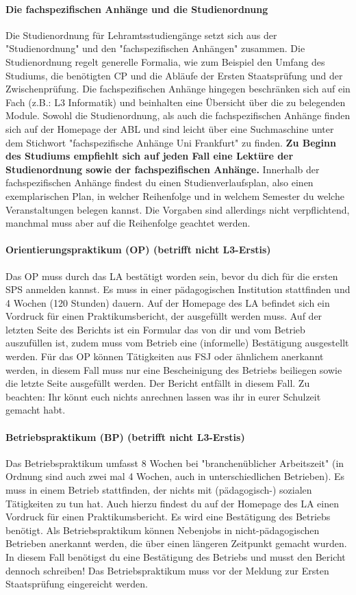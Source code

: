 \paragraph{Die fachspezifischen Anhänge und die Studienordnung}
Die Studienordnung für Lehramtsstudiengänge setzt sich aus der
"Studienordnung" und den "fachspezifischen Anhängen" zusammen. Die Studienordnung regelt generelle Formalia, wie zum Beispiel den Umfang des Studiums, die benötigten CP und die Abläufe der Ersten Staatsprüfung und der Zwischenprüfung.
Die fachspezifischen Anhänge hingegen beschränken sich auf ein Fach (z.B.: L3 Informatik) und beinhalten eine Übersicht über die zu belegenden Module.
Sowohl die Studienordnung, als auch die fachspezifischen Anhänge finden sich auf der Homepage der ABL und sind leicht über eine Suchmaschine unter dem Stichwort "fachspezifische Anhänge Uni Frankfurt" zu finden.
\textbf{Zu Beginn des Studiums empfiehlt sich auf jeden Fall eine Lektüre der Studienordnung sowie der fachspezifischen Anhänge.}
Innerhalb der fachspezifischen Anhänge findest du einen Studienverlaufsplan, also einen exemplarischen Plan, in welcher Reihenfolge und in welchem Semester du welche Veranstaltungen belegen kannst. Die Vorgaben sind allerdings nicht verpflichtend, manchmal muss aber auf die Reihenfolge geachtet werden.

\paragraph{Orientierungspraktikum (OP) (betrifft nicht L3-Erstis)}
Das OP muss durch das LA bestätigt worden sein, bevor du dich für die ersten SPS anmelden kannst. Es muss in einer pädagogischen Institution stattfinden und 4 Wochen (120 Stunden) dauern. Auf der Homepage des LA befindet sich ein Vordruck für einen Praktikumsbericht, der ausgefüllt werden muss. Auf der letzten Seite des Berichts ist ein Formular das von dir und vom Betrieb auszufüllen ist, zudem muss vom Betrieb eine (informelle) Bestätigung ausgestellt werden.
Für das OP können Tätigkeiten aus FSJ oder ähnlichem anerkannt werden, in diesem Fall muss nur eine Bescheinigung des Betriebs beiliegen sowie die letzte Seite ausgefüllt werden. Der Bericht entfällt in diesem Fall.
Zu beachten: Ihr könnt euch nichts anrechnen lassen was ihr in eurer Schulzeit gemacht habt.

\paragraph{Betriebspraktikum (BP) (betrifft nicht L3-Erstis)}
Das Betriebspraktikum umfasst 8 Wochen bei "branchenüblicher Arbeitszeit" (in Ordnung sind auch zwei mal 4 Wochen, auch in unterschiedlichen Betrieben). Es muss in einem Betrieb stattfinden, der nichts mit (pädagogisch-) sozialen Tätigkeiten zu tun hat. Auch hierzu findest du auf der Homepage des LA einen Vordruck für einen Praktikumsbericht. Es wird eine Bestätigung des Betriebs benötigt.
Als Betriebspraktikum können Nebenjobs in nicht-pädagogischen Betrieben anerkannt werden, die über einen längeren Zeitpunkt gemacht wurden. In diesem Fall benötigst du eine Bestätigung des Betriebs und musst den Bericht dennoch schreiben!
Das Betriebspraktikum muss vor der Meldung zur Ersten Staatsprüfung eingereicht werden.
\spaltenende
